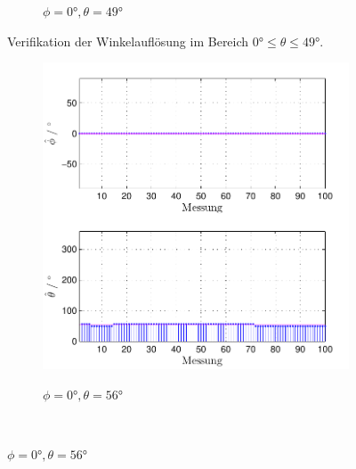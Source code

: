 \begin{figure}
\begin{subfigure}[b]{0.48\textwidth}
                \label{fig:Foto_DSP_Draufsicht}
                \caption{$\phi=0°, \theta = 49°$}
        \end{subfigure}
        \caption{Verifikation der Winkelauflösung im Bereich $0° \leq \theta \leq 49°$.}
        \label{fig:verifikation_winkelaufloesung_1}
\end{figure}









\begin{figure}
        \centering
        \begin{subfigure}[b]{0.48\textwidth}
                \centering
                \includegraphics[width=\textwidth]{images/04_Echtzeitversuch/MALE_Phi_0_Theta_56}
                \label{fig:Foto_DSP_Draufsicht_Seitanansicht}
                \caption{$\phi=0°, \theta = 56°$}
        \end{subfigure}
        ~ %

\end{figure}
